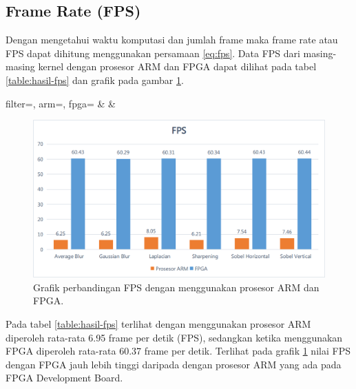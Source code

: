 \subsection{Frame Rate (FPS)}
Dengan mengetahui waktu komputasi dan jumlah frame maka frame rate atau FPS dapat dihitung menggunakan persamaan \ref{eq:fps}. Data FPS dari masing-masing kernel dengan prosesor ARM dan FPGA dapat dilihat pada tabel \ref{table:hasil-fps} dan grafik pada gambar \ref{fig:chart-fps}.
\begin{atable}
    \caption{Tabel perbandingan FPS dengan menggunakan prosesor ARM dan FPGA.}
    \label{table:hasil-fps}
        {
            filter=\filter, 
            arm=\arm, 
            fpga=\fpga}
        {
            \filter & 
            \arm & 
            \fpga }
\end{atable}
\begin{figure}[H]
    \includegraphics[width=0.81\linewidth, center]{images/chart/chart-fps.png}
    \caption{Grafik perbandingan FPS dengan menggunakan prosesor ARM dan FPGA.}
    \label{fig:chart-fps}
\end{figure}

Pada tabel \ref{table:hasil-fps} terlihat dengan menggunakan prosesor ARM diperoleh rata-rata 6.95 frame per detik (FPS), sedangkan ketika menggunakan FPGA diperoleh rata-rata 60.37 frame per detik. Terlihat pada grafik \ref{fig:chart-fps} nilai FPS dengan FPGA jauh lebih tinggi daripada dengan prosesor ARM yang ada pada FPGA Development Board.


